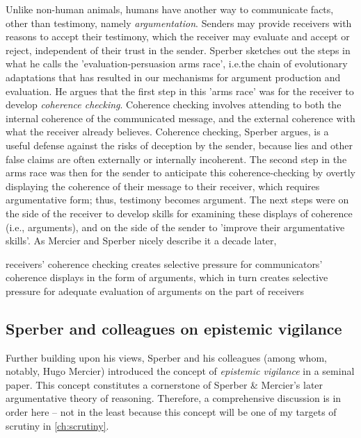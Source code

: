 Unlike non-human animals, humans have another way to communicate facts, other than testimony, namely \emph{argumentation}. Senders may provide receivers with reasons to accept their testimony, which the receiver may evaluate and accept or reject, independent of their trust in the sender.
Sperber sketches out the steps in what he calls the 'evaluation-persuasion arms race', i.e.\@ the chain of evolutionary adaptations that has resulted in our mechanisms for argument production and evaluation.
He argues that the first step in this 'arms race' was for the receiver to develop \emph{coherence checking}. Coherence checking involves attending to both the internal coherence of the communicated message, and the external coherence with what the receiver already believes. Coherence checking, Sperber argues, is a useful defense against the risks of deception by the sender, because lies and other false claims are often externally or internally incoherent.
The second step in the arms race was then for the sender to anticipate this coherence-checking by overtly displaying the coherence of their message to their receiver, which requires argumentative form; thus, testimony becomes argument.
The next steps were on the side of the receiver to develop skills for examining these displays of coherence (i.e., arguments), and on the side of the sender to 'improve their argumentative skills'.
As Mercier and Sperber nicely describe it a decade later,
\begin{quoting}
    receivers' coherence checking creates selective pressure for communicators' coherence displays in the form of arguments, which in turn creates selective pressure for adequate evaluation of arguments on the part of receivers
    \hfill \citep[p.~96]{MS11}
\end{quoting}

\subsection{Sperber and colleagues on epistemic vigilance}
\label{sec:Sperber10}

Further building upon his \citeyear{Sperber01} views, Sperber and his colleagues (among whom, notably, Hugo Mercier) introduced the concept of \emph{epistemic vigilance} in a seminal \citeyear{Sperber10} paper. This concept constitutes a cornerstone of Sperber \& Mercier's later argumentative theory of reasoning. Therefore, a comprehensive discussion is in order here -- not in the least because this concept will be one of my targets of scrutiny in \cref{ch:scrutiny}.

